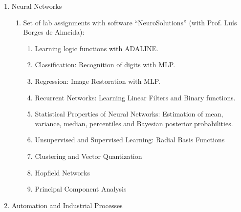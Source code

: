 \begin{enumerate}
  \begin{enumerate}
  \def\labelenumii{\alph{enumii}.}
  \item
    Update of the set of slides supporting the lectures (with Prof.
    Santos-Victor).
  \item
    Lab assignment on 3D Scanner from casting shadows on objects (with
    Prof. José Santos-Victor):

    \begin{enumerate}
    \def\labelenumiii{\roman{enumiii}.}
    \item
      System calibration with checkerboard patterns through
      back-projection error minimization.
    \item
      Light source pose estimation with Least Squares
    \item
      Contour detection.
    \item
      3D reconstruction of the sequence of cast shadows.
    \end{enumerate}
  \end{enumerate}
\item
  Neural Networks

  \begin{enumerate}
  \def\labelenumii{\alph{enumii}.}
  \item
    Set of lab assignments with software ``NeuroSolutions'' (with Prof.
    Luís Borges de Almeida):

    \begin{enumerate}
    \def\labelenumiii{\roman{enumiii}.}
    \item
      Learning logic functions with ADALINE.
    \item
      Classification: Recognition of digits with MLP.
    \item
      Regression: Image Restoration with MLP.
    \item
      Recurrent Networks: Learning Linear Filters and Binary functions.
    \item
      Statistical Properties of Neural Networks: Estimation of mean,
      variance, median, percentiles and Bayesian posterior
      probabilities.
    \item
      Unsupervised and Supervised Learning: Radial Basis Functions
    \item
      Clustering and Vector Quantization
    \item
      Hopfield Networks
    \item
      Principal Component Analysis
    \end{enumerate}
  \end{enumerate}
\item
  Automation and Industrial Processes


\end{enumerate}
